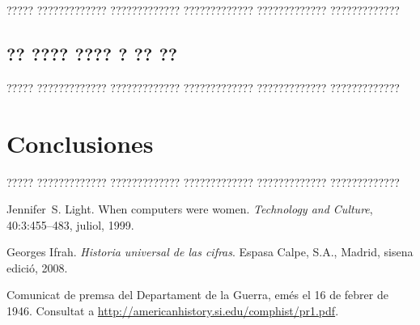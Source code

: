 \documentclass[11pt,spanish,listoffigures,listoftables]{tfgetsinf}
\begin{document}
????? ????????????? ????????????? ????????????? ????????????? ????????????? 

\section{?? ???? ???? ? ?? ??}

????? ????????????? ????????????? ????????????? ????????????? ?????????????


\chapter{Conclusiones}

????? ????????????? ????????????? ????????????? ????????????? ????????????? 


\begin{thebibliography}{10}

   Jennifer~S. Light.
   \newblock When computers were women.
   \newblock \textit{Technology and Culture}, 40:3:455--483, juliol, 1999.

   Georges Ifrah.
   \newblock \textit{Historia universal de las cifras}.
   \newblock Espasa Calpe, S.A., Madrid, sisena edició, 2008.

   Comunicat de premsa del Departament de la Guerra, 
   emés el 16 de febrer de 1946. 
   \newblock Consultat a 
   \url{http://americanhistory.si.edu/comphist/pr1.pdf}.

\end{thebibliography}
\cleardoublepage
\end{document}

